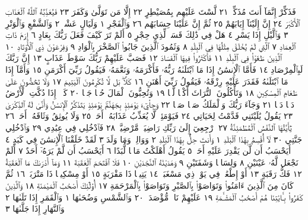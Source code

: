 فَذَكِّرْ إِنَّمَآ أَنتَ مُذَكِّرࣱ ٢١ لَّسْتَ عَلَيْهِم بِمُصَيْطِرٍ ٢٢
إِلَّا مَن تَوَلَّىٰ وَكَفَرَ ٢٣ فَيُعَذِّبُهُ ٱللَّهُ ٱلْعَذَابَ ٱلْأَكْبَرَ ٢٤
إِنَّ إِلَيْنَآ إِيَابَهُمْ ٢٥ ثُمَّ إِنَّ عَلَيْنَا حِسَابَهُم ٢٦
وَٱلْفَجْرِ ١ وَلَيَالٍ عَشْرࣲ ٢ وَٱلشَّفْعِ وَٱلْوَتْرِ ٣ وَٱلَّيْلِ إِذَا يَسْرِ ٤
هَلْ فِي ذَٰلِكَ قَسَمࣱ لِّذِي حِجْرٍ ٥ أَلَمْ تَرَ كَيْفَ فَعَلَ رَبُّكَ بِعَادٍ ٦
إِرَمَ ذَاتِ ٱلْعِمَادِ ٧ ٱلَّتِي لَمْ يُخْلَقْ مِثْلُهَا فِي ٱلْبِلَٰدِ ٨ وَثَمُودَ ٱلَّذِينَ
جَابُوا۟ ٱلصَّخْرَ بِٱلْوَادِ ٩ وَفِرْعَوْنَ ذِي ٱلْأَوْتَادِ ١٠ ٱلَّذِينَ طَغَوْا۟ فِي
ٱلْبِلَٰدِ ١١ فَأَكْثَرُوا۟ فِيهَا ٱلْفَسَادَ ١٢ فَصَبَّ عَلَيْهِمْ رَبُّكَ سَوْطَ
عَذَابٍ ١٣ إِنَّ رَبَّكَ لَبِٱلْمِرْصَادِ ١٤ فَأَمَّا ٱلْإِنسَٰنُ إِذَا مَا ٱبْتَلَىٰهُ
رَبُّهُۥ فَأَكْرَمَهُۥ وَنَعَّمَهُۥ فَيَقُولُ رَبِّيٓ أَكْرَمَنِ ١٥ وَأَمَّآ إِذَا مَا ٱبْتَلَىٰهُ
فَقَدَرَ عَلَيْهِ رِزْقَهُۥ فَيَقُولُ رَبِّيٓ أَهَٰنَنِ ١٦ كَلَّاۖ بَل لَّا تُكْرِمُونَ
ٱلْيَتِيمَ ١٧ وَلَا تَحَٰٓضُّونَ عَلَىٰ طَعَامِ ٱلْمِسْكِينِ ١٨ وَتَأْكُلُونَ
ٱلتُّرَاثَ أَكْلࣰا لَّمࣰّا ١٩ وَتُحِبُّونَ ٱلْمَالَ حُبࣰّا جَمࣰّا ٢٠ كَلَّآۖ إِذَا
دُكَّتِ ٱلْأَرْضُ دَكࣰّا دَكࣰّا ٢١ وَجَآءَ رَبُّكَ وَٱلْمَلَكُ صَفࣰّا صَفࣰّا ٢٢
وَجِا۟يٓءَ يَوْمَئِذِۭ بِجَهَنَّمَۚ يَوْمَئِذࣲ يَتَذَكَّرُ ٱلْإِنسَٰنُ وَأَنَّىٰ
لَهُ ٱلذِّكْرَىٰ ٢٣ يَقُولُ يَٰلَيْتَنِي قَدَّمْتُ لِحَيَاتِي ٢٤ فَيَوْمَئِذࣲ
لَّا يُعَذِّبُ عَذَابَهُۥٓ أَحَدࣱ ٢٥ وَلَا يُوثِقُ وَثَاقَهُۥٓ أَحَدࣱ ٢٦ يَٰٓأَيَّتُهَا
ٱلنَّفْسُ ٱلْمُطْمَئِنَّةُ ٢٧ ٱرْجِعِيٓ إِلَىٰ رَبِّكِ رَاضِيَةࣰ مَّرْضِيَّةࣰ ٢٨
فَٱدْخُلِي فِي عِبَٰدِي ٢٩ وَٱدْخُلِي جَنَّتِي ٣٠
لَآ أُقْسِمُ بِهَٰذَا ٱلْبَلَدِ ١ وَأَنتَ حِلُّۢ بِهَٰذَا ٱلْبَلَدِ ٢ وَوَالِدࣲ وَمَا وَلَدَ ٣
لَقَدْ خَلَقْنَا ٱلْإِنسَٰنَ فِي كَبَدٍ ٤ أَيَحْسَبُ أَن لَّن يَقْدِرَ عَلَيْهِ
أَحَدࣱ ٥ يَقُولُ أَهْلَكْتُ مَالࣰا لُّبَدًا ٦ أَيَحْسَبُ أَن لَّمْ يَرَهُۥٓ أَحَدٌ ٧
أَلَمْ نَجْعَل لَّهُۥ عَيْنَيْنِ ٨ وَلِسَانࣰا وَشَفَتَيْنِ ٩ وَهَدَيْنَٰهُ
ٱلنَّجْدَيْنِ ١٠ فَلَا ٱقْتَحَمَ ٱلْعَقَبَةَ ١١ وَمَآ أَدْرَىٰكَ مَا ٱلْعَقَبَةُ ١٢
فَكُّ رَقَبَةٍ ١٣ أَوْ إِطْعَٰمࣱ فِي يَوْمࣲ ذِي مَسْغَبَةࣲ ١٤ يَتِيمࣰا ذَا مَقْرَبَةٍ ١٥
أَوْ مِسْكِينࣰا ذَا مَتْرَبَةࣲ ١٦ ثُمَّ كَانَ مِنَ ٱلَّذِينَ ءَامَنُوا۟ وَتَوَاصَوْا۟
بِٱلصَّبْرِ وَتَوَاصَوْا۟ بِٱلْمَرْحَمَةِ ١٧ أُو۟لَٰٓئِكَ أَصْحَٰبُ ٱلْمَيْمَنَةِ ١٨
وَٱلَّذِينَ كَفَرُوا۟ بِـَٔايَٰتِنَا هُمْ أَصْحَٰبُ ٱلْمَشْـَٔمَةِ ١٩ عَلَيْهِمْ نَارࣱ مُّؤْصَدَةُۢ ٢٠
وَٱلشَّمْسِ وَضُحَىٰهَا ١ وَٱلْقَمَرِ إِذَا تَلَىٰهَا ٢ وَٱلنَّهَارِ إِذَا جَلَّىٰهَا ٣
